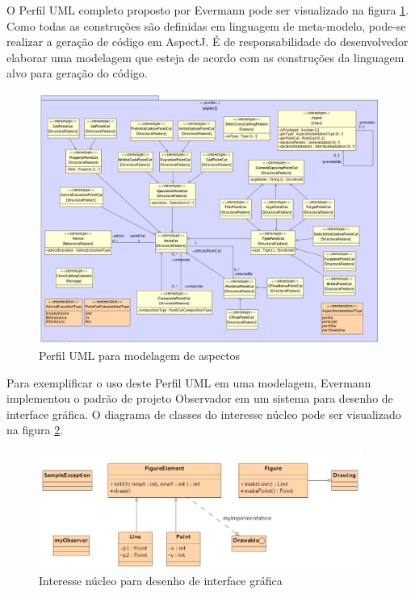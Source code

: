 O Perfil UML completo proposto por Evermann pode ser visualizado na figura \ref{fig:p21_aspectj_profile}. Como todas as construções são definidas em
linguagem de meta-modelo, pode-se realizar a geração de código em AspectJ. É de responsabilidade do desenvolvedor elaborar uma modelagem que esteja de acordo 
com as construções da linguagem alvo para geração do código. 

\begin{landscape}
\begin{figure}
	\centering
	\includegraphics[width=650px]{img/p21_aspectj_profile.png}
	\caption{Perfil UML para modelagem de aspectos \cite{Evermann:2007:MSP:1229375.1229379}}\label{fig:p21_aspectj_profile}
\end{figure}
\end{landscape}

Para exemplificar o uso deste Perfil UML em uma modelagem, Evermann implementou o padrão de projeto Observador \cite{Gamma:1995:DPE:186897} em um
sistema para desenho de interface gráfica. O diagrama de classes do interesse núcleo pode ser visualizado na figura \ref{fig:p21_base_model}. 

\begin{figure}
	\centering
	\includegraphics[width=400px]{img/p21_base_model.png}
	\caption{Interesse núcleo para desenho de interface gráfica}\label{fig:p21_base_model}
\end{figure}

